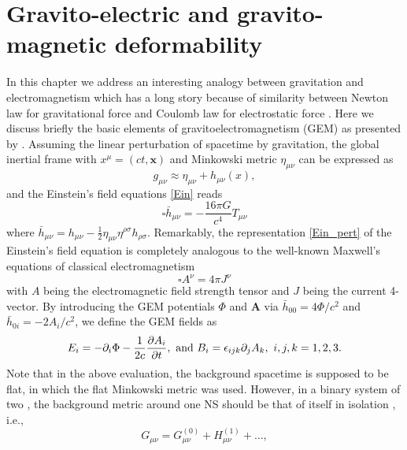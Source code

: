 \section{Gravito-electric and gravito-magnetic deformability}%
\label{sec3.2}
In this chapter we address an interesting analogy between gravitation and electromagnetism
which has a long story because of similarity between Newton law for gravitational 
force and Coulomb law for electrostatic force \cite{mashhoon2003gravitoelectromagnetism}.
Here we discuss briefly the basic elements of gravitoelectromagnetism (\gls{GEM}) as 
presented by \cite{damour2009relativistic}. Assuming the linear perturbation of spacetime
by gravitation, the global inertial frame with $x^{\mu} = (ct, \mathbf{x})$ and 
Minkowski metric $\eta_{\mu\nu}$ can be expressed as
\begin{equation}
    g_{\mu\nu} \approx \eta_{\mu\nu} + h_{\mu\nu}(x),
\end{equation}
and the Einstein's field equations \eqref{Ein} reads
\begin{equation}
  \square \bar{h}_{\mu\nu} = - \frac{16\pi G}{c^4} T_{\mu\nu} \label{Ein_pert}
\end{equation}
where $\bar{h}_{\mu\nu}=h_{\mu\nu}-\frac{1}{2}\eta_{\mu\nu}\eta^{\rho\sigma}h_{\rho\sigma}$. Remarkably, the representation \eqref{Ein_pert} of the Einstein's field equation is 
completely analogous to the well-known Maxwell's equations of classical electromagnetism
\begin{equation}
    \square A^\nu = 4\pi J^\nu
\end{equation}
with $A$ being the electromagnetic field strength tensor and $J$ being the current 
4-vector. By introducing the \gls{GEM} potentials $\Phi$ and $\mathbf{A}$ via 
$\bar{h}_{00}=4\Phi/c^2$ and $\bar{h}_{0i} = -2A_i/c^2$, we define the \gls{GEM} fields as
\begin{equation}
E_{i} = -\partial_i\Phi - \frac{1}{2c}\pdv{A_i}{t},\ {\rm and}\ 
B_i = \epsilon_{ijk}\partial_j A_k,\ i,j,k=1,2,3. \label{eq3.9}
\end{equation}
Note that in the above evaluation, the background spacetime is supposed to be flat, 
in which the flat Minkowski metric was used. However, in a binary system of two , 
the background metric around one \gls{NS} should be that of itself in isolation 
\citep{damour2009relativistic}, i.e., 
\begin{equation}
    G_{\mu\nu} = G^{(0)}_{\mu\nu} + H^{(1)}_{\mu\nu} + \ldots, \label{eq3.10} 
\end{equation}
